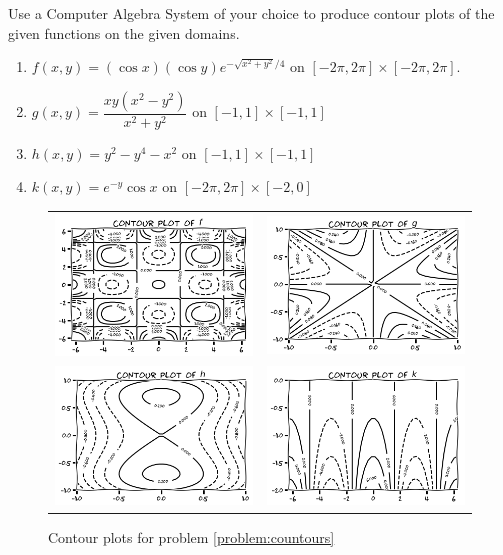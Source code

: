 \begin{problem}[CAS]\label{problem:countours}
Use a Computer Algebra System of your choice to produce contour plots of the given functions on the given domains.
\begin{enumerate}
	\item $f(x,y) = (\cos x)(\cos y) e^{-\sqrt{x^2+y^2}/4}$ on $[-2\pi, 2\pi]\times [-2\pi, 2\pi]$.
	\item $g(x,y) = \dfrac{xy(x^2-y^2)}{x^2+y^2}$ on $[-1,1] \times [-1,1]$
	\item $h(x,y) = y^2 - y^4 -x^2$ on $[-1,1]\times[-1,1]$
	\item $k(x,y) = e^{-y}\cos x$ on $[-2\pi, 2\pi]\times[-2,0]$
\end{enumerate}
\begin{figure}[ht!]
\begin{tabular}{cc}
\includegraphics[width=0.5\linewidth]{contourf.png} &
\includegraphics[width=0.5\linewidth]{contourg.png} \\
\includegraphics[width=0.5\linewidth]{contourh.png} &
\includegraphics[width=0.5\linewidth]{contourk.png} 
\end{tabular}
\caption{Contour plots for problem \ref{problem:countours}}
\end{figure}
\end{problem}

